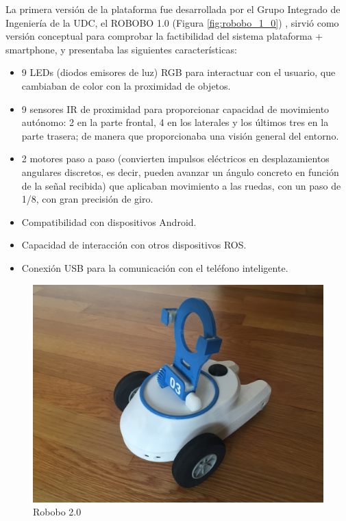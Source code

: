 La primera versión de la plataforma fue desarrollada por el Grupo Integrado de Ingeniería de la UDC, el ROBOBO 1.0 (Figura \ref{fig:robobo_1_0}) , sirvió como versión conceptual para comprobar la factibilidad del sistema plataforma + smartphone, y presentaba las siguientes características:

\begin{itemize}

	\item 9 LEDs (diodos emisores de luz) RGB para interactuar con el usuario, que cambiaban de color con la proximidad de objetos.
	\item 9 sensores IR de proximidad para proporcionar capacidad de movimiento autónomo: 2 en la parte frontal, 4 en los laterales y los últimos tres en la parte trasera; de manera que proporcionaba una visión general del entorno.
	\item 2 motores paso a paso (convierten impulsos eléctricos en desplazamientos angulares discretos, es decir, pueden avanzar un ángulo concreto en función de la señal recibida) que aplicaban movimiento a las ruedas, con un paso de 1/8, con gran precisión de giro.
	\item Compatibilidad con dispositivos Android.
	\item Capacidad de interacción con otros dispositivos ROS.
	\item Conexión USB para la comunicación con el teléfono inteligente.

\end{itemize}


\begin{figure}
	\centering
	\includegraphics[width=0.8\linewidth]{imagenes/robobo_rob.JPG}
	\caption{Robobo 2.0}
	\label{fig:robobo_2_0}
\end{figure} 

